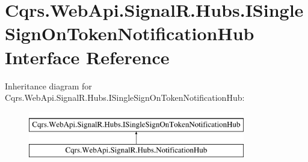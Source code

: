 \hypertarget{interfaceCqrs_1_1WebApi_1_1SignalR_1_1Hubs_1_1ISingleSignOnTokenNotificationHub}{}\section{Cqrs.\+Web\+Api.\+Signal\+R.\+Hubs.\+I\+Single\+Sign\+On\+Token\+Notification\+Hub Interface Reference}
\label{interfaceCqrs_1_1WebApi_1_1SignalR_1_1Hubs_1_1ISingleSignOnTokenNotificationHub}
Inheritance diagram for Cqrs.\+Web\+Api.\+Signal\+R.\+Hubs.\+I\+Single\+Sign\+On\+Token\+Notification\+Hub\+:\begin{figure}[H]
\begin{center}
\leavevmode
\includegraphics[height=2.000000cm]{interfaceCqrs_1_1WebApi_1_1SignalR_1_1Hubs_1_1ISingleSignOnTokenNotificationHub}
\end{center}
\end{figure}
